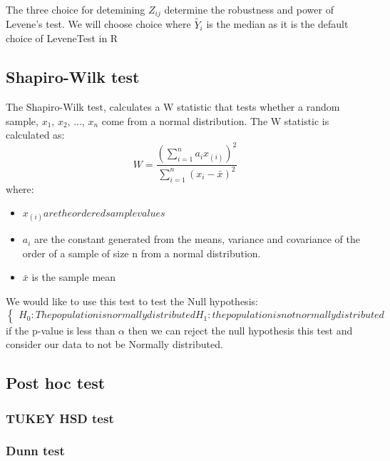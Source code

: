 The three choice for detemining $Z_{ij}$ determine the robustness and power of Levene's test. We will choose choice where $\tilde{Y_i}$ is the median as it is the default choice of LeveneTest in R

\subsection{Shapiro-Wilk test}
The Shapiro-Wilk test, calculates a W statistic that tests whether a random sample, $x_1$, $x_2$, ..., $x_n$ come from a normal distribution. 
The W statistic is calculated as:
\[W = \frac{(\sum_{i=1}^{n}a_ix_{(i)})^2}{\sum_{i=1}^{n}(x_i-\bar{x})^2}\]
where:
\begin{itemize}
    \item $x_{(i)}are the ordered sample values$
    \item $a_i$ are the constant generated from the means, variance and covariance of the order of a sample of size n from a normal distribution.
    \item $\bar{x}$ is the sample mean
\end{itemize}
We would like to use this test to test the Null hypothesis:
\[
\begin{cases}
    H_0: The population is normally distributed
    H_1: the population is not normally distributed
\end{cases}
\]
if the p-value is less than $\alpha$ then we can reject the null hypothesis this test and consider our data to not be Normally distributed.
\subsection{Post hoc test}
\subsubsection{TUKEY HSD test}

\subsubsection{Dunn test}



